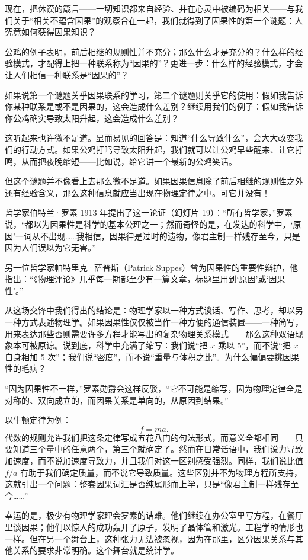现在，把休谟的箴言——一切知识都来自经验、并在心灵中被编码为相关——与我们关于“相关不蕴含因果”的观察合在一起，我们就得到了因果性的第一个谜题：人究竟如何获得因果知识？

公鸡的例子表明，前后相继的规则性并不充分；那么什么才是充分的？什么样的经验模式，才配得上把一种联系称为“因果的”？更进一步：什么样的经验模式，才会让人们相信一种联系是“因果的”？

如果说第一个谜题关乎因果联系的学习，第二个谜题则关乎它的使用：假如我告诉你某种联系是或不是因果的，这会造成什么差别？继续用我们的例子：假如我告诉你公鸡确实导致太阳升起，这会造成什么差别？

这听起来也许微不足道。显而易见的回答是：知道“什么导致什么”，会大大改变我们的行动方式。如果公鸡打鸣导致太阳升起，我们就可以让公鸡早些醒来、让它打鸣，从而把夜晚缩短——比如说，给它讲一个最新的公鸡笑话。

但这个谜题并不像看上去那么微不足道。如果因果信息除了前后相继的规则性之外还有经验含义，那么这种信息就应当出现在物理定律之中。可它并没有！

哲学家伯特兰·罗素 1913 年提出了这一论证（幻灯片 19）：“所有哲学家，”罗素说，“都以为因果性是科学的基本公理之一；然而奇怪的是，在发达的科学中，‘原因’一词从不出现……我相信，因果律是过时的遗物，像君主制一样残存至今，只是因为人们误以为它无害。”

另一位哲学家帕特里克·萨普斯（Patrick Suppes）曾为因果性的重要性辩护，他指出：“《物理评论》几乎每一期都至少有一篇文章，标题里用到‘原因’或‘因果性’。”

从这场交锋中我们得出的结论是：物理学家以一种方式谈话、写作、思考，却以另一种方式表述物理学。如果因果性仅仅被当作一种方便的通信装置——一种简写，用来表达那些否则需要许多方程才能写出的复杂物理关系模式——那么这种双语现象本可被原谅。说到底，科学中充满了缩写：我们说“把 $x$ 乘以 5”，而不说“把 $x$ 自身相加 5 次”；我们说“密度”，而不说“重量与体积之比”。为什么偏偏要挑因果性的毛病？

“因为因果性不一样，”罗素勋爵会这样反驳，“它不可能是缩写，因为物理定律全是对称的、双向成立的，而因果关系是单向的，从原因到结果。”

以牛顿定律为例：
\[
f = ma.
\]
代数的规则允许我们把这条定律写成五花八门的句法形式，而意义全都相同——只要知道三个量中的任意两个，第三个就确定了。然而在日常话语中，我们说力导致加速度，而不说加速度导致力，并且我们对这一区别感受强烈。同样，我们说比值 $f/a$ 有助于我们确定质量，而不说它导致质量。这些区别并不为物理方程所支持，这就引出一个问题：整套因果词汇是否纯属形而上学，只是“像君主制一样残存至今……”

幸运的是，极少有物理学家理会罗素的诘难。他们继续在办公室里写方程，在餐厅里谈因果；他们以惊人的成功轰开了原子，发明了晶体管和激光。工程学的情形也一样。但在另一个舞台上，这种张力无法被忽视，因为在那里，区分因果关系与其他关系的要求非常明确。这个舞台就是统计学。

